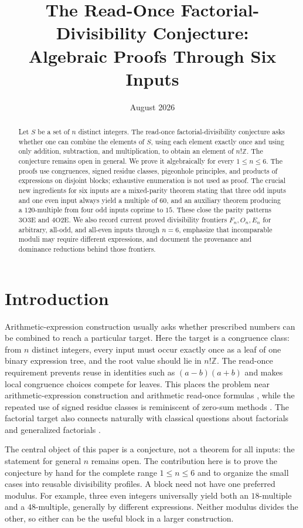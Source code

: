 \documentclass[11pt]{amsart}
\title[Read-Once Factorial Divisibility Through Six Inputs]{The Read-Once Factorial-Divisibility Conjecture:\\Algebraic Proofs Through Six Inputs}
\author{\AuthorName}
\date{August 2026}
\theoremstyle{definition}
\theoremstyle{remark}
\newcommand{\Z}{\mathbb Z}
\newcommand{\OO}{\mathrm O}
\newcommand{\EE}{\mathrm E}
\begin{document}
\begin{abstract}
Let $S$ be a set of $n$ distinct integers.  The read-once
factorial-divisibility conjecture asks whether one can combine the elements of
$S$, using each element exactly once and using only addition, subtraction, and
multiplication, to obtain an element of $n!\Z$.  The conjecture remains open in
general.  We prove it algebraically for every $1\le n\le 6$.  The proofs use
congruences, signed residue classes, pigeonhole principles, and products of
expressions on disjoint blocks; exhaustive enumeration is not used as proof.
The crucial new ingredients for six inputs are a mixed-parity theorem stating
that three odd inputs and one even input always yield a multiple of $60$, and
an auxiliary theorem producing a $120$-multiple from four odd inputs coprime
to $15$.  These close the parity patterns $3\OO3\EE$ and $4\OO2\EE$.  We also
record current proved divisibility frontiers $F_n,O_n,E_n$ for arbitrary,
all-odd, and all-even inputs through $n=6$, emphasize that incomparable
moduli may require different expressions, and document the provenance and
dominance reductions behind those frontiers.
\end{abstract}

\maketitle
\pagestyle{plain}

\section{Introduction}
Arithmetic-expression construction usually asks whether prescribed numbers
can be combined to reach a particular target.  Here the target is a
congruence class: from $n$ distinct integers, every input must occur exactly
once as a leaf of one binary expression tree, and the root value should lie
in $n!\Z$.  The read-once requirement prevents reuse in identities such as
$(a-b)(a+b)$ and makes local congruence choices compete for leaves.  This
places the problem near arithmetic-expression construction
\cite{AlcockEtAl2020} and arithmetic read-once formulas
\cite{BshoutyHancockHellerstein1995}, while the repeated use of signed residue
classes is reminiscent of zero-sum methods
\cite{ErdosGinzburgZiv1961,GaoGeroldinger2006}.  The factorial target also
connects naturally with classical questions about factorials and generalized
factorials \cite{Bhargava2000}.

The central object of this paper is a conjecture, not a theorem for all
inputs: the statement for general $n$ remains open.  The contribution here is
to prove the conjecture by hand for the complete range $1\le n\le6$ and to
organize the small cases into reusable divisibility profiles.  A block need
not have one preferred modulus.  For example, three even integers
universally yield both an $18$-multiple and a $48$-multiple, generally by
different expressions.  Neither modulus divides the other, so either can be
the useful block in a larger construction.
\end{document}
